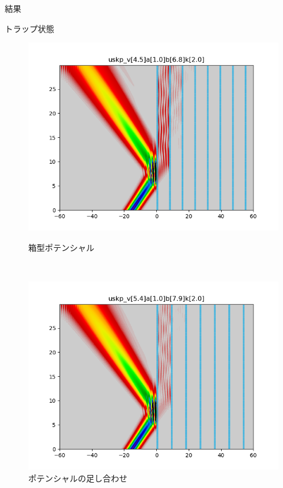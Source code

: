 \documentclass[a4paper, lualatex]{bxjsarticle}
\begin{document}
\begin{section}{結果}
\begin{subsection}{トラップ状態}
\begin{figure}[h]
            \begin{minipage}{0.5\hsize}
                \centering
                \includegraphics[width=0.9\hsize]{trap2.png}
                \caption{箱型ポテンシャル}
            \end{minipage}\\
            \begin{minipage}{0.5\hsize}
                \centering
                \includegraphics[width=0.9\hsize]{trap3.png}
                \caption{ポテンシャルの足し合わせ}
            \end{minipage}
            \begin{minipage}{0.5\hsize}
                \centering

\end{minipage}
\end{figure}
\end{subsection}
\end{section}
\end{document}
